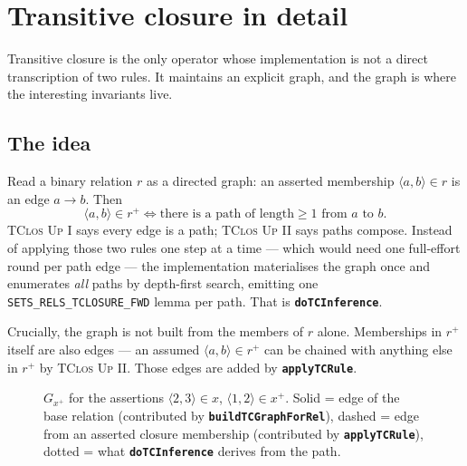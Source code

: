 \documentclass[11pt,a4paper]{article}
\newcommand{\code}[1]{\texttt{\small #1}}
\newcommand{\fn}[1]{\texttt{\small\bfseries #1}}
\newcommand{\tup}[1]{\langle #1 \rangle}
\newcommand{\tc}[1]{{#1}^{+}}
\theoremstyle{definition}
\begin{document}
\section{Transitive closure in detail}\label{sec:tcdetail}

Transitive closure is the only operator whose implementation is not a direct
transcription of two rules. It maintains an explicit graph, and the graph is
where the interesting invariants live.

\subsection{The idea}

Read a binary relation $r$ as a directed graph: an asserted membership
$\tup{a,b}\in r$ is an edge $a\to b$. Then
\[
  \tup{a,b} \in \tc{r} \iff \text{there is a path of length} \ge 1
  \text{ from } a \text{ to } b .
\]
\textsc{TClos Up I} says every edge is a path; \textsc{TClos Up II} says paths
compose. Instead of applying those two rules one step at a time --- which would
need one full-effort round per path edge --- the implementation materialises the
graph once and enumerates \emph{all} paths by depth-first search, emitting one
\code{SETS\_RELS\_TCLOSURE\_FWD} lemma per path. That is
\fn{doTCInference}.

Crucially, the graph is not built from the members of $r$ alone. Memberships in
$\tc{r}$ itself are also edges --- an assumed $\tup{a,b}\in \tc{r}$ can be
chained with anything else in $\tc{r}$ by \textsc{TClos Up II}. Those edges are
added by \fn{applyTCRule}.

\begin{figure}[h]\centering
{}
\caption{$G_{\tc{x}}$ for the assertions
$\tup{2,3}\in x$, $\tup{1,2}\in\tc{x}$. Solid = edge of the base relation
(contributed by \fn{buildTCGraphForRel}), dashed = edge from an asserted
closure membership (contributed by \fn{applyTCRule}), dotted = what
\fn{doTCInference} derives from the path.}
\label{fig:tcmix}
\end{figure}
\end{document}
